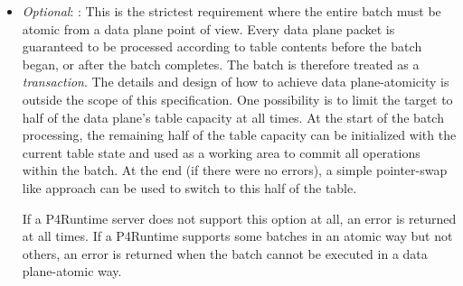 \documentclass[11pt]{article}
\begin{document}
{\begin{itemize}
If a P4Runtime server does not support this option at all, an
 error is returned at all times. If a P4Runtime
supports some batches in an rollback way but not others (e.g. it is
more straightforward to implement batches that contain only 
operations, vs. those that contain  operations), an
 error is returned when the batch cannot be executed
in a data plane-atomic way.%

\item{}
\emph{Optional}: : This is the strictest requirement where the
entire batch must be atomic from a data plane point of view. Every data plane
packet is guaranteed to be processed according to table contents before the
batch began, or after the batch completes. The batch is therefore treated as a
\emph{transaction}. The details and design of how to achieve data plane-atomicity
is outside the scope of this specification. One possibility is to limit the
target to half of the data plane's table capacity at all times. At the start
of the batch processing, the remaining half of the table capacity can be
initialized with the current table state and used as a working area to commit
all operations within the batch. At the end (if there were no errors), a
simple pointer-swap like approach can be used to switch to this half of the
table.%

If a P4Runtime server does not support this option at all, an 
error is returned at all times. If a P4Runtime supports some batches in an
atomic way but not others, an  error is returned when the batch
cannot be executed in a data plane-atomic way.%
\end{itemize}%

}
\end{document}
